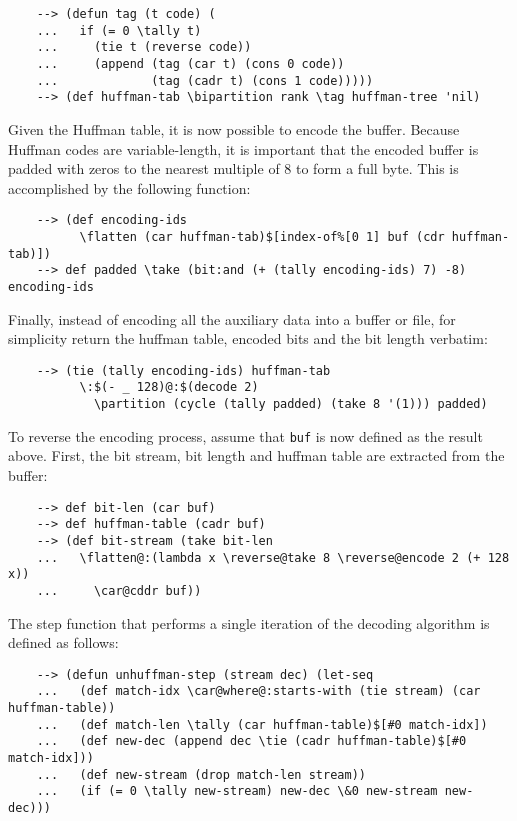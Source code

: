 \begin{Verbatim}
    --> (defun tag (t code) (
    ...   if (= 0 \tally t)
    ...     (tie t (reverse code))
    ...     (append (tag (car t) (cons 0 code))
    ...             (tag (cadr t) (cons 1 code)))))
    --> (def huffman-tab \bipartition rank \tag huffman-tree 'nil)
\end{Verbatim}

Given the Huffman table, it is now possible to encode the buffer. Because Huffman codes are variable-length, it is important that the encoded buffer is padded with zeros to the nearest multiple of 8 to form a full byte. This is accomplished by the following function:

\begin{Verbatim}
    --> (def encoding-ids
          \flatten (car huffman-tab)$[index-of%[0 1] buf (cdr huffman-tab)])
    --> def padded \take (bit:and (+ (tally encoding-ids) 7) -8) encoding-ids
\end{Verbatim}

Finally, instead of encoding all the auxiliary data into a buffer or file, for simplicity return the huffman table, encoded bits and the bit length verbatim:

\begin{Verbatim}
    --> (tie (tally encoding-ids) huffman-tab
          \:$(- _ 128)@:$(decode 2)
            \partition (cycle (tally padded) (take 8 '(1))) padded)
\end{Verbatim}

To reverse the encoding process, assume that \verb|buf| is now defined as the result above. First, the bit stream, bit length and huffman table are extracted from the buffer:

\begin{Verbatim}
    --> def bit-len (car buf)
    --> def huffman-table (cadr buf)
    --> (def bit-stream (take bit-len
    ...   \flatten@:(lambda x \reverse@take 8 \reverse@encode 2 (+ 128 x))
    ...     \car@cddr buf))
\end{Verbatim}

The step function that performs a single iteration of the decoding algorithm is defined as follows:

\begin{Verbatim}
    --> (defun unhuffman-step (stream dec) (let-seq
    ...   (def match-idx \car@where@:starts-with (tie stream) (car huffman-table))
    ...   (def match-len \tally (car huffman-table)$[#0 match-idx])
    ...   (def new-dec (append dec \tie (cadr huffman-table)$[#0 match-idx]))
    ...   (def new-stream (drop match-len stream))
    ...   (if (= 0 \tally new-stream) new-dec \&0 new-stream new-dec)))
\end{Verbatim}

